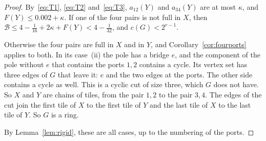 \begin{proof}
By~\eqref{eq:T1}, \eqref{eq:T2} and~\eqref{eq:T3}, $a_{12}(Y)$ and $a_{34}(Y)$ are at most
$\kappa$, and $F(Y)\le0.002+\kappa$. If one of the four pairs is not full in $X$, then
$\mathcal B\le4-\frac1{16}+2\kappa+F(Y)<4-\frac1{32}$, and $c(G)<2^{r-1}$.

Otherwise the four pairs are full in $X$ and in $Y$, and Corollary~\ref{cor:fourports} applies to
both. In its case~(ii) the pole has a bridge $e$, and the component of the pole without $e$ that
contains the ports $1,2$ contains a cycle. Its vertex set has three edges of $G$ that leave it:
$e$ and the two edges at the ports. The other side contains a cycle as well. This is a cyclic cut
of size three, which $G$ does not have. So $X$ and $Y$ are chains of tiles, from the pair $1,2$ to
the pair $3,4$. The edges of the cut join the first tile of $X$ to the first tile of $Y$ and the
last tile of $X$ to the last tile of $Y$. So $G$ is a ring.

By Lemma~\ref{lem:rigid}, these are all cases, up to the numbering of the ports.
\end{proof}
